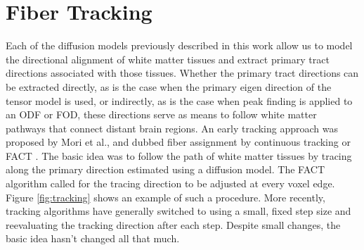 \section{Fiber Tracking}

Each of the diffusion models previously described in this work allow us to model the directional alignment of white matter tissues and extract primary tract directions associated with those tissues. Whether the primary tract directions can be extracted directly, as is the case when the primary eigen direction of the tensor model is used, or indirectly, as is the case when peak finding is applied to an ODF or FOD, these directions serve as means to follow white matter pathways that connect distant brain regions. An early tracking approach was proposed by Mori et al., and dubbed  fiber assignment by continuous tracking or FACT \cite{Mori_1999}. The basic idea was to follow the path of white matter tissues by tracing along the primary direction estimated using a diffusion model. The FACT algorithm called for the tracing direction to be adjusted at every voxel edge. Figure \ref{fig:tracking} shows an example of such a procedure. More recently, tracking algorithms have generally switched to using a small, fixed step size and reevaluating the tracking direction after each step. Despite small changes, the basic idea hasn't changed all that much.